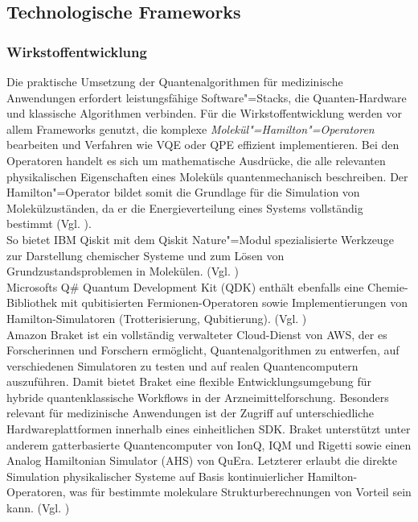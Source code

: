 \subsection{Technologische Frameworks}

\subsubsection*{Wirkstoffentwicklung}
Die praktische Umsetzung der Quantenalgorithmen für medizinische Anwendungen erfordert leistungsfähige Software"=Stacks, die Quanten-Hardware und klassische Algorithmen verbinden. Für die Wirkstoffentwicklung werden vor allem Frameworks genutzt, die komplexe \textit{Molekül"=Hamilton"=Operatoren} bearbeiten und Verfahren wie VQE oder QPE effizient implementieren. Bei den Operatoren handelt es sich um mathematische Ausdrücke, die alle relevanten physikalischen Eigenschaften eines Moleküls quantenmechanisch beschreiben. Der Hamilton"=Operator bildet somit die Grundlage für die Simulation von Molekülzuständen, da er die Energieverteilung eines Systems vollständig bestimmt (Vgl. \cite{mcardle}).\\

So bietet IBM Qiskit mit dem Qiskit Nature"=Modul spezialisierte Werkzeuge zur Darstellung chemischer Systeme und zum Lösen von Grundzustandsproblemen in Molekülen. (Vgl. \cite{noauthor_qiskit_2022})\\

Microsofts Q\# Quantum Development Kit (QDK) enthält ebenfalls eine Chemie-Bibliothek mit qubitisierten Fermionen-Operatoren sowie Implementierungen von Hamilton-Simulatoren (Trotterisierung, Qubitierung). (Vgl. \cite{msazure}) \\

Amazon Braket ist ein vollständig verwalteter Cloud-Dienst von AWS, der es Forscherinnen und Forschern ermöglicht, Quantenalgorithmen zu entwerfen, auf verschiedenen Simulatoren zu testen und auf realen Quantencomputern auszuführen. Damit bietet Braket eine flexible Entwicklungsumgebung für hybride quantenklassische Workflows in der Arzneimittelforschung. Besonders relevant für medizinische Anwendungen ist der Zugriff auf unterschiedliche Hardwareplattformen innerhalb eines einheitlichen SDK. Braket unterstützt unter anderem gatterbasierte Quantencomputer von IonQ, IQM und Rigetti sowie einen Analog Hamiltonian Simulator (AHS) von QuEra. Letzterer erlaubt die direkte Simulation physikalischer Systeme auf Basis kontinuierlicher Hamilton-Operatoren, was für bestimmte molekulare Strukturberechnungen von Vorteil sein kann. (Vgl. \cite{amazonbraket})\\

